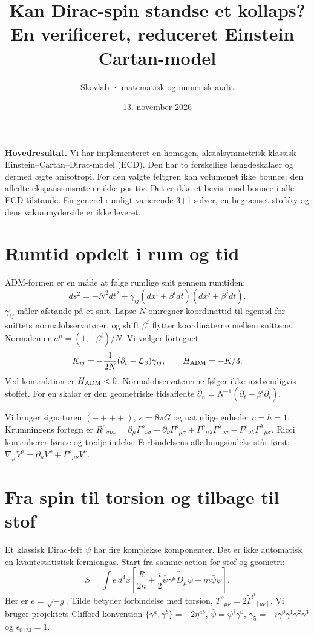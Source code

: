 \documentclass[11pt,a4paper]{article}
\title{Kan Dirac-spin standse et kollaps?\\\large En verificeret, reduceret Einstein--Cartan-model}
\author{Skovlab · matematisk og numerisk audit}
\date{13. november 2026}
\begin{document}
\maketitle
\textbf{Hovedresultat.} Vi har implementeret en homogen, aksialsymmetrisk klassisk Einstein--Cartan--Dirac-model (ECD). Den har to forskellige længdeskalaer og dermed ægte anisotropi. For den valgte feltgren kan volumenet ikke bounce: den afledte ekspansionsrate er ikke positiv. Det er ikke et bevis imod bounce i alle ECD-tilstande. En generel rumligt varierende 3+1-solver, en begrænset stofsky og dens vakuumyderside er ikke leveret.

\section{Rumtid opdelt i rum og tid}
ADM-formen er en måde at følge rumlige snit gennem rumtiden:
\begin{equation}
 ds^2=-N^2dt^2+\gamma_{ij}(dx^i+\beta^idt)(dx^j+\beta^jdt).
\end{equation}
$\gamma_{ij}$ måler afstande på et snit. Lapse $N$ omregner koordinattid til egentid for snittets normalobservatører, og shift $\beta^i$ flytter koordinaterne mellem snittene. Normalen er $n^\mu=(1,-\beta^i)/N$. Vi vælger fortegnet
\begin{equation}
 K_{ij}=-\frac1{2N}(\partial_t-\mathcal L_\beta)\gamma_{ij},\qquad H_{\rm ADM}=-K/3.
\end{equation}
Ved kontraktion er $H_{\rm ADM}<0$. Normalobservatørerne følger ikke nødvendigvis stoffet. For en skalar er den geometriske tidsafledte
$\partial_n=N^{-1}(\partial_t-\beta^i\partial_i)$.

Vi bruger signaturen $(-+++)$, $\kappa=8\pi G$ og naturlige enheder $c=\hbar=1$. Krumningens fortegn er
$R^\rho{}_{\sigma\mu\nu}=\partial_\mu\Gamma^\rho{}_{\nu\sigma}-\partial_\nu\Gamma^\rho{}_{\mu\sigma}+\Gamma^\rho{}_{\mu\lambda}\Gamma^\lambda{}_{\nu\sigma}-\Gamma^\rho{}_{\nu\lambda}\Gamma^\lambda{}_{\mu\sigma}$.
Ricci kontraherer første og tredje indeks. Forbindelsens afledningsindeks står først: $\nabla_\mu V^\rho=\partial_\mu V^\rho+\Gamma^\rho{}_{\mu\nu}V^\nu$.

\section{Fra spin til torsion og tilbage til stof}
Et klassisk Dirac-felt $\psi$ har fire komplekse komponenter. Det er ikke automatisk en kvantestatistisk fermiongas. Start fra samme action for stof og geometri:
\begin{equation}
 S=\int e\,d^4x\left[\frac{\widetilde R}{2\kappa}
 +\frac i2\bar\psi\gamma^\mu\overleftrightarrow{\widetilde D}_\mu\psi
 -m\bar\psi\psi\right].
\end{equation}
Her er $e=\sqrt{-g}$. Tilde betyder forbindelse med torsion, $T^\rho{}_{\mu\nu}=2\widetilde\Gamma^\rho{}_{[\mu\nu]}$. Vi bruger projektets Clifford-konvention $\{\gamma^a,\gamma^b\}=-2\eta^{ab}$, $\bar\psi=\psi^\dagger\gamma^0$, $\gamma_5=-i\gamma^0\gamma^1\gamma^2\gamma^3$ og $\epsilon_{0123}=1$.
\end{document}
